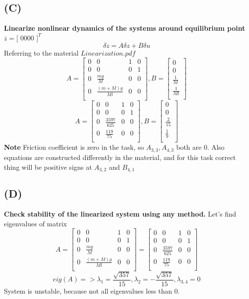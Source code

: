 \documentclass[a4paper,11pt]{article}
\theoremstyle{mytheor}
\begin{document}
\subsection*{(C)} 
\textbf{Linearize nonlinear dynamics of the systems around equilibrium point} $\overline{z} = [$ $0$\space\space$0$\space\space$0$\space\space$0$ $]^{T}$\newline
\[
\delta\dot{z}=A\delta z+B\delta u
\]
Referring to the material $Linearization.pdf$\newline
\[
A=
\begin{bmatrix}
0&0&1&0\\
0&0&0&1\\
0&\frac{mg}{M}&0&0\\
0&\frac{(m+M)g}{Ml}&0&0\\
\end{bmatrix}
,B=
\begin{bmatrix}
0\\
0\\
\frac{1}{M}\\
\frac{1}{Ml}\\
\end{bmatrix}
\]
\[
A=
\begin{bmatrix}
0&0&1&0\\
0&0&0&1\\
0&\frac{3597}{625}&0&0\\
0&\frac{119}{75}&0&0\\
\end{bmatrix}
,B=
\begin{bmatrix}
0\\
0\\
\frac{2}{15}\\
\frac{1}{9}\\
\end{bmatrix}
\]
\textbf{Note}\newline
Friction coefficient is zero in the task, so $A_{3,3}, A_{4,3}$ both are $0$.\newline
Also equations are constructed differently in the material, and for this task correct thing will be positive signs at $A_{3,2}$ and $B_{4,1}$
\subsection*{(D)}
\textbf{Check stability of the linearized system using any method.}\newline
Let's find eigenvalues of matrix
\[
A=
\begin{bmatrix}
0&0&1&0\\
0&0&0&1\\
0&\frac{mg}{M}&0&0\\
0&\frac{(m+M)g}{Ml}&0&0\\
\end{bmatrix}
=
\begin{bmatrix}
0&0&1&0\\
0&0&0&1\\
0&\frac{3597}{625}&0&0\\
0&\frac{119}{75}&0&0\\
\end{bmatrix}
\]
\[
eig(A)=>
\lambda_{1}=\frac{\sqrt{357}}{15}, \lambda_{2}=-\frac{\sqrt{357}}{15}, \lambda_{3,4}=0
\]
System is unstable, because not all eigenvalues less than $0$.
\end{document}
